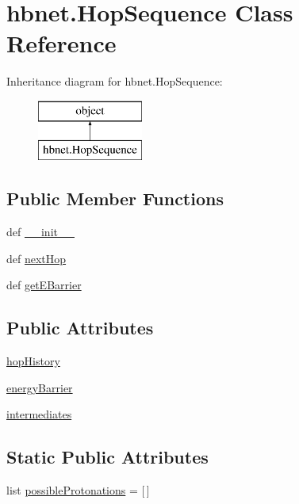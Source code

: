 \hypertarget{classhbnet_1_1_hop_sequence}{\section{hbnet.\-Hop\-Sequence Class Reference}
\label{classhbnet_1_1_hop_sequence}
}
Inheritance diagram for hbnet.\-Hop\-Sequence\-:\begin{figure}[H]
\begin{center}
\leavevmode
\includegraphics[height=2.000000cm]{classhbnet_1_1_hop_sequence}
\end{center}
\end{figure}
\subsection*{Public Member Functions}
\begin{DoxyCompactItemize}
\item 
def \hyperlink{classhbnet_1_1_hop_sequence_a8ce1038313142603c0040fc1e2d1e3f6}{\-\_\-\-\_\-init\-\_\-\-\_\-}
\item 
def \hyperlink{classhbnet_1_1_hop_sequence_aa5149f754e11572cd28ab071130d74c8}{next\-Hop}
\item 
def \hyperlink{classhbnet_1_1_hop_sequence_ad2d86f340617a9750077fe68c96b63f7}{get\-E\-Barrier}
\end{DoxyCompactItemize}
\subsection*{Public Attributes}
\begin{DoxyCompactItemize}
\item 
\hyperlink{classhbnet_1_1_hop_sequence_a66dd2f48420f66b8d167b4ee84d41481}{hop\-History}
\item 
\hyperlink{classhbnet_1_1_hop_sequence_a1c05eea4fe546f604fa4709ea707f07f}{energy\-Barrier}
\item 
\hyperlink{classhbnet_1_1_hop_sequence_af4dceddc7a9cf838faef6e7ea4539e58}{intermediates}
\end{DoxyCompactItemize}
\subsection*{Static Public Attributes}
\begin{DoxyCompactItemize}
\item 
list \hyperlink{classhbnet_1_1_hop_sequence_a3b83a5768107cf8e552c7f969a27374f}{possible\-Protonations} = \mbox{[}$\,$\mbox{]}
\end{DoxyCompactItemize}


